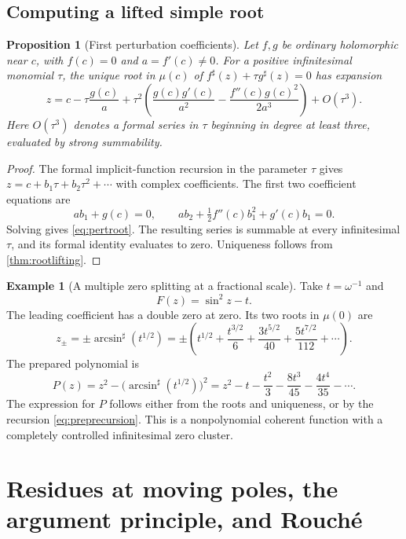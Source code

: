 \documentclass[11pt,letterpaper]{article}
\newtheorem{proposition}[theorem]{Proposition}
\theoremstyle{definition}
\newtheorem{example}[theorem]{Example}
\theoremstyle{remark}
\newcommand{\sh}{^{\sharp}}
\numberwithin{equation}{section}
\begin{document}
\subsection{Computing a lifted simple root}
\begin{proposition}[First perturbation coefficients]\label{prop:pertroot}
Let $f,g$ be ordinary holomorphic near $c$, with $f(c)=0$ and $a=f'(c)\ne0$. For a positive infinitesimal monomial $\tau$, the unique root in $\mu(c)$ of $f\sh(z)+\tau g\sh(z)=0$ has expansion
\begin{equation}\label{eq:pertroot}
 z=c-\tau\frac{g(c)}a
 +\tau^2\left(\frac{g(c)g'(c)}{a^2}
              -\frac{f''(c)g(c)^2}{2a^3}\right)+O(\tau^3).
\end{equation}
Here $O(\tau^3)$ denotes a formal series in $\tau$ beginning in degree at least three, evaluated by strong summability.
\end{proposition}
\begin{proof}
The formal implicit-function recursion in the parameter $\tau$ gives $z=c+b_1\tau+b_2\tau^2+\cdots$ with complex coefficients. The first two coefficient equations are
\[
 ab_1+g(c)=0,\qquad
 ab_2+\tfrac12f''(c)b_1^2+g'(c)b_1=0.
\]
Solving gives \eqref{eq:pertroot}. The resulting series is summable at every infinitesimal $\tau$, and its formal identity evaluates to zero. Uniqueness follows from \cref{thm:rootlifting}.
\end{proof}

\begin{example}[A multiple zero splitting at a fractional scale]\label{ex:sinroots}
Take $t=\omega^{-1}$ and
\[
 F(z)=\sin^2z-t.
\]
The leading coefficient has a double zero at zero. Its two roots in $\mu(0)$ are
\[
 z_\pm=\pm\arcsin\sh(t^{1/2})
 =\pm\left(t^{1/2}+\frac{t^{3/2}}6+
                   \frac{3t^{5/2}}{40}+\frac{5t^{7/2}}{112}+\cdots\right).
\]
The prepared polynomial is
\[
 P(z)=z^2-\bigl(\arcsin\sh(t^{1/2})\bigr)^2
 =z^2-t-\frac{t^2}{3}-\frac{8t^3}{45}-\frac{4t^4}{35}-\cdots.
\]
The expression for $P$ follows either from the roots and uniqueness, or by the recursion \eqref{eq:preprecursion}. This is a nonpolynomial coherent function with a completely controlled infinitesimal zero cluster.
\end{example}

\section{Residues at moving poles, the argument principle, and Rouch\'e}\label{sec:residues}
\end{document}
